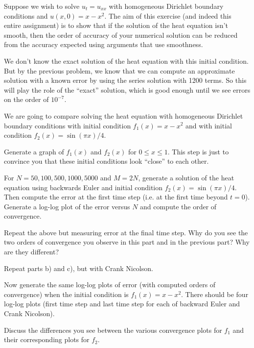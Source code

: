 \documentclass[minion]{homework}
\begin{document}
\begin{problems}
\problem Suppose we wish to solve $u_t=u_{xx}$ with homogeneous 
Dirichlet boundary conditions and $u(x,0)=x-x^2$.  The aim
of this exercise (and indeed this entire assignment) is to show
that if the solution of the heat equation isn't smooth, then
the order of accuracy of your numerical solution can be reduced
from the accuracy expected using arguments that use smoothness.

We don't know the exact solution of the heat equation with this
initial condition.  But by the previous problem, we know that we can
compute an approximate solution with a known error by using the series
solution with 1200 terms.  So this will play the role of the ``exact''
solution, which is good enough until we see errors on the order of $10^{-7}$.

We are going to compare solving the heat equation with homogeneous 
Dirichlet boundary conditions with initial condition $f_1(x)=x-x^2$ and 
with initial condition $f_2(x) = \sin(\pi x)/4$.

\begin{subproblems}
\item Generate a graph of $f_1(x)$ and $f_2(x)$ for $0\le x \le 1$.  This
step is just to convince you that these initial conditions look ``close''
to each other.

\item For $N = 50, 100, 500, 1000, 5000$ and $M=2N$, generate
a solution of the heat equation using backwards Euler and initial
condition $f_2(x)=\sin(\pi x)/4$.  
Then compute the error at the first time step (i.e.
at the first time beyond $t=0$).  Generate a log-log plot of the error
versus $N$ and compute the order of convergence.  

\item Repeat the above but measuring error at the final time step.
Why do you see the two orders of convergence you observe
in this part and in the previous part? Why are they different?

\item Repeat parts b) and c), but with Crank Nicolson.

\item Now generate the same log-log plots of error (with computed
orders of convergence) when the initial condition is $f_1(x)=x-x^2$.
There should be four log-log plots (first time step and last time step
for each of backward Euler and Crank Nicolson).

\item Discuss the differences you see between the various convergence
plots for $f_1$ and their corresponding plots for $f_2$.
\end{subproblems}

\end{problems}
\end{document}
